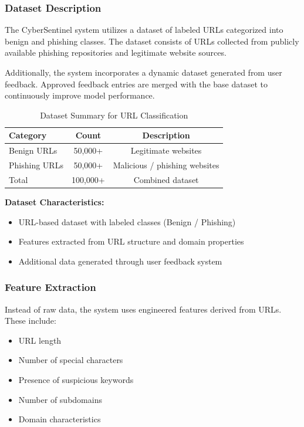 \subsubsection{Dataset Description}

The CyberSentinel system utilizes a dataset of labeled URLs categorized into benign and phishing classes. The dataset consists of URLs collected from publicly available phishing repositories and legitimate website sources.

Additionally, the system incorporates a dynamic dataset generated from user feedback. Approved feedback entries are merged with the base dataset to continuously improve model performance.

\begin{table}[H]
	\centering
	\caption{Dataset Summary for URL Classification}
	\begin{tabular}{lcc}
		\toprule
		\textbf{Category} & \textbf{Count} & \textbf{Description} \\
		\midrule
		Benign URLs & 50,000+ & Legitimate websites \\
		Phishing URLs & 50,000+ & Malicious / phishing websites \\
		Total & 100,000+ & Combined dataset \\
		\bottomrule
	\end{tabular}
\end{table}

\textbf{Dataset Characteristics:}
\begin{itemize}
	\item URL-based dataset with labeled classes (Benign / Phishing)
	\item Features extracted from URL structure and domain properties
	\item Additional data generated through user feedback system
\end{itemize}

\subsubsection{Feature Extraction}

Instead of raw data, the system uses engineered features derived from URLs. These include:

\begin{itemize}
	\item URL length
	\item Number of special characters
	\item Presence of suspicious keywords
	\item Number of subdomains
	\item Domain characteristics
\end{itemize}

